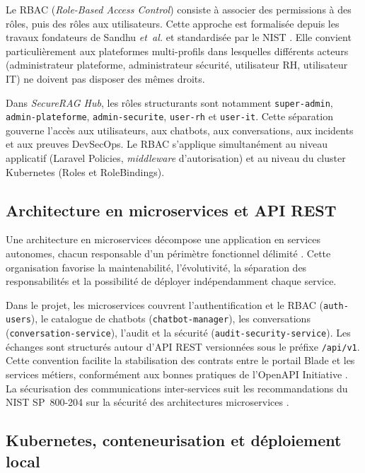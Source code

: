 Le RBAC (\textit{Role-Based Access Control}) consiste à associer des permissions à des rôles, puis des rôles aux utilisateurs. Cette approche est formalisée depuis les travaux fondateurs de Sandhu \textit{et~al.} \cite{sandhu_rbac_1996} et standardisée par le NIST \cite{nist_rbac_standard}. Elle convient particulièrement aux plateformes multi-profils dans lesquelles différents acteurs (administrateur plateforme, administrateur sécurité, utilisateur RH, utilisateur IT) ne doivent pas disposer des mêmes droits.

Dans \textit{SecureRAG Hub}, les rôles structurants sont notamment \texttt{super-admin}, \texttt{admin-plateforme}, \texttt{admin-securite}, \texttt{user-rh} et \texttt{user-it}. Cette séparation gouverne l'accès aux utilisateurs, aux chatbots, aux conversations, aux incidents et aux preuves DevSecOps. Le RBAC s'applique simultanément au niveau applicatif (Laravel Policies, \textit{middleware} d'autorisation) et au niveau du cluster Kubernetes (Roles et RoleBindings).

\subsection{Architecture en microservices et API REST}

Une architecture en microservices décompose une application en services autonomes, chacun responsable d'un périmètre fonctionnel délimité \cite{newman_microservices,fowler_microservices_2014}. Cette organisation favorise la maintenabilité, l'évolutivité, la séparation des responsabilités et la possibilité de déployer indépendamment chaque service.

Dans le projet, les microservices couvrent l'authentification et le RBAC (\texttt{auth-users}), le catalogue de chatbots (\texttt{chatbot-manager}), les conversations (\texttt{conversation-service}), l'audit et la sécurité (\texttt{audit-security-service}). Les échanges sont structurés autour d'API REST versionnées sous le préfixe \texttt{/api/v1}. Cette convention facilite la stabilisation des contrats entre le portail Blade et les services métiers, conformément aux bonnes pratiques de l'OpenAPI Initiative \cite{openapi_spec}. La sécurisation des communications inter-services suit les recommandations du NIST SP~800-204 sur la sécurité des architectures microservices \cite{nist_sp_800_204}.

\subsection{Kubernetes, conteneurisation et déploiement local}

